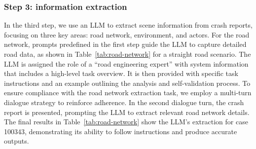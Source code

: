 
\subsubsection{Step 3: information extraction}
In the third step, we use an LLM to extract scene information from crash reports, focusing on three key areas: road network, environment, and actors. For the road network, prompts predefined in the first step guide the LLM to capture detailed road data, as shown in Table~\ref{tab:road-network} for a straight road scenario. The LLM is assigned the role of a ``road engineering expert'' with system information that includes a high-level task overview. It is then provided with specific task instructions and an example outlining the analysis and self-validation process. To ensure compliance with the road network extraction task, we employ a multi-turn dialogue strategy to reinforce adherence. In the second dialogue turn, the crash report is presented, prompting the LLM to extract relevant road network details. The final results in Table~\ref{tab:road-network} show the LLM's extraction for case 100343, demonstrating its ability to follow instructions and produce accurate outputs.



